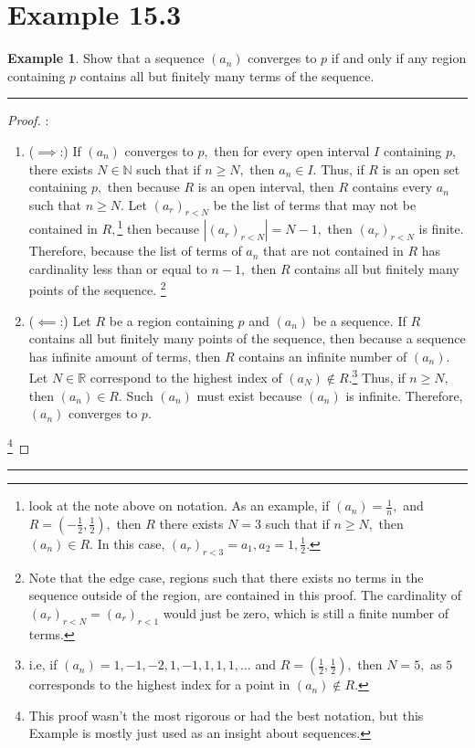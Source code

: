 \documentclass[openany, amssymb, psamsfonts]{amsart}
\newcommand{\bbN}{\mathbb{N}}
\newcommand{\bbR}{\mathbb{R}}
\theoremstyle{definition}
\newtheorem{exmp}{Example}[section]
\numberwithin{equation}{section}
\begin{document}
\section*{Example 15.3}
\begin{exmp}
\label{15.3}
	Show that a sequence $(a_n)$ converges to $p$ if and only if any region containing $p$ contains all but finitely many terms of the sequence.
\end{exmp}
\vspace{4pt}     \hrule   \vspace{4pt} \begin{proof}:\\
\begin{enumerate}
\item ($\implies$:) If $(a_n)$ converges to $p,$ then for every open interval $I$ containing $p,$ there exists $N \in \bbN$ such that if $n\geq N,$ then $a_n \in I.$ Thus, if $R$ is an open set containing $p,$ then because $R$ is an open interval, then $R$ contains every $a_n$ such that $n\geq N.$ Let $(a_r)_{r<N}$ be the list of terms that may not be contained in $R,$\footnote{look at the note above on notation. As an example, if $(a_n) = \frac{1}{n},$ and $R = (-\frac{1}{2}, \frac{1}{2}),$ then $R$ there exists $N = 3$ such that if $n\geq N,$ then $(a_n) \in R.$ In this case, $(a_r)_{r<3} = a_1, a_2 = 1,\frac{1}{2}.$} then because $|(a_r)_{r<N}| = N-1,$ then $(a_r)_{r<N}$ is finite. Therefore, because the list of terms of $a_n$ that are not contained in $R$ has cardinality less than or equal to $n-1,$ then $R$ contains all but finitely many points of the sequence. \footnote{Note that the edge case, regions such that there exists no terms in the sequence outside of the region, are contained in this proof. The cardinality of $(a_r)_{r<N} = (a_r)_{r<1}$ would just be zero, which is still a finite number of terms.}
\item ($\impliedby$:) Let $R$ be a region containing $p$ and $(a_n)$ be a sequence. If $R$ contains all but finitely many points of the sequence, then because a sequence has infinite amount of terms, then $R$ contains an infinite number of $(a_n).$ Let $N\in \bbR$ correspond to the highest index of $(a_N)\notin R.$\footnote{ i.e, if $(a_n) = 1,-1,-2,1,-1,1,1,1,\dots$ and $R = (\frac{1}{2}, \frac{1}{2}),$ then $N = 5,$ as $5$ corresponds to the highest index for a point in $(a_n)\notin R.$} Thus, if $n\geq N,$ then $(a_n)\in R.$ Such $(a_n)$ must exist because $(a_n)$ is infinite. Therefore, $(a_n)$ converges to $p.$
\end{enumerate}
\footnote{This proof wasn't the most rigorous or had the best notation, but this Example is mostly just used as an insight about sequences.}
\end{proof}\vspace{4pt}     \hrule   \vspace{4pt} 
\end{document}
